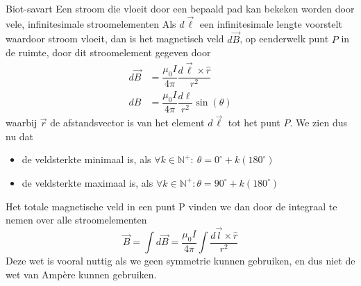 \begin{lem}{Biot-savart}
    Een stroom die vloeit door een bepaald pad kan bekeken worden door vele, infinitesimale
    stroomelementen
    Als $d\Vec{\ell}$ een infinitesimale lengte voorstelt waardoor stroom
    vloeit, dan is het magnetisch veld $d\Vec{B}$, op eenderwelk punt $P$ in de ruimte, door
    dit stroomelement gegeven door
    \begin{align*}
        d\Vec{B} &= \dfrac{\mu_{0}I}{4\pi}\dfrac{d\Vec{\ell} \times \hat{r}}{r^2} \\
              dB &= \dfrac{\mu_{0}I}{4\pi}\dfrac{d\ell}{r^2}\sin{(\theta)}
    \end{align*}
    waarbij $\Vec{r}$ de afstandsvector is van het element $d\Vec{\ell}$ tot het punt $P$.
    We zien dus nu dat 
    \begin{itemize}
        \item de veldsterkte minimaal is, als $\forall k \in \mathbb{N}^{+}: \ \theta = 0^{\circ} + k(180^{\circ})$
        \item de veldsterkte maximaal is, als $\forall k \in \mathbb{N}^{+}: \theta = 90^{\circ} + k(180^{\circ})$
    \end{itemize} 
    Het totale magnetische veld in een punt P vinden we dan door de integraal te nemen over alle stroomelementen
    \begin{equation*}
        \Vec{B} = \int d\Vec{B} = \dfrac{\mu_{0}I}{4\pi} \int \dfrac{d\Vec{l} \times \hat{r}}{r^{2}}
    \end{equation*}
    Deze wet is vooral nuttig als we geen symmetrie kunnen gebruiken, en dus niet de wet van Ampère kunnen gebruiken.
\end{lem}


\newpage

    

